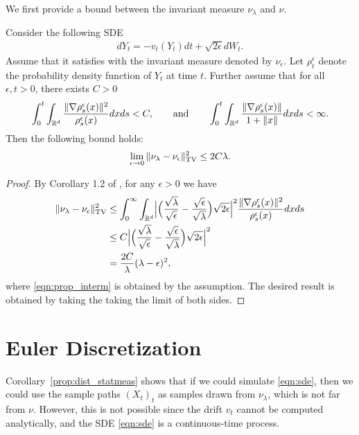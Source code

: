 We first provide a bound between the invariant measure $\nu_\lambda$ and $\nu$.

\begin{prop}
\label{prop:dist_statmeas}
Consider the following SDE
\begin{align}
d Y_t = - v_t(Y_t) dt + \sqrt{2 \epsilon } d W_t. \label{eqn:sde_eps}
\end{align}
Assume that it satisfies  with the invariant measure denoted by $\nu_\epsilon$. Let $\rho^\epsilon_t$ denote the probability density function of $Y_t$ at time $t$. Further assume that for all $\epsilon,t>0$, there exists $C >0$  
\begin{align}
\int_{0}^t \int_{\mathbb{R}^d} \frac{\|\nabla \rho^\epsilon_s(x) \|^2}{\rho^\epsilon_s(x)} dx ds <C, \qquad \text{and} \qquad \int_{0}^t \int_{\mathbb{R}^d}  \frac{\|\nabla \rho^\epsilon_s(x)\|}{1+\|x\|} dx ds <\infty.
\end{align}
Then the following bound holds:
\begin{align}
\lim_{\epsilon \rightarrow 0} \| \nu_\lambda - \nu_\epsilon \|_{\textnormal{TV}}^2 \leq 2 C \lambda.
\end{align}
\end{prop}
%
\begin{proof}
By Corollary 1.2 of \cite{bogachev2016distances}, for any $\epsilon > 0$ we have 
\begin{align}
\| \nu_\lambda - \nu_\epsilon \|_{\textnormal{TV}}^2 &\leq \int_0^\infty \int_{\mathbb{R}^d} \Bigl| \Bigl(\frac{\sqrt{\lambda}}{\sqrt{\epsilon}}- \frac{\sqrt{\epsilon}}{\sqrt{\lambda}} \Bigr) \sqrt{2\epsilon}  \Bigr|^2 \frac{\|\nabla \rho^\epsilon_s(x)\|^2}{\rho^\epsilon_s(x)}  dx ds \\
&\leq  C \Bigl| \Bigl(\frac{\sqrt{\lambda}}{\sqrt{\epsilon}}- \frac{\sqrt{\epsilon}}{\sqrt{\lambda}} \Bigr) \sqrt{2\epsilon}  \Bigr|^2 \label{eqn:prop_interm} \\
&= \frac{2C}{\lambda} (\lambda - \epsilon)^2,
\end{align}
where \eqref{eqn:prop_interm} is obtained by the assumption. The desired result is obtained by taking the taking the limit of both sides. 
\end{proof}
%



\section{Euler Discretization}


Corollary~\ref{prop:dist_statmeas} shows that if we could simulate \eqref{eqn:sde}, then we could use the sample paths $(X_t)_t$ as
samples drawn from $\nu_\lambda$, which is not far from $\nu$. However, this is not possible since the drift $v_t$ cannot be computed analytically, and the SDE \eqref{eqn:sde} is a continuous-time process.


